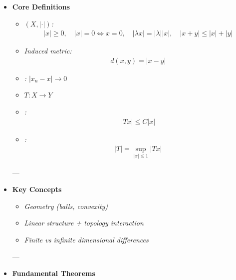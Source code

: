 \documentclass[12pt,a4paper]{report}
\begin{document}
\begin{description}
\begin{itemize}
Add  $\to$ geometry + analysis.

---

    \item \textbf{Core Definitions}

            \begin{itemize}
            \item \textit{ $(X,|\cdot|)$:}
\begin{align*}
  |x|\ge 0,\quad |x|=0 \iff x=0,\quad |\lambda x|=|\lambda||x|,\quad |x+y|\le |x|+|y|
\end{align*}

            \item \textit{Induced metric:}
\begin{align*}
  d(x,y)=|x-y|
\end{align*}

            \item \textit{: $|x_n-x|\to 0$}

            \item \textit{ $T:X\to Y$}

            \item \textit{:}
\begin{align*}
  |Tx|\le C|x|
\end{align*}

            \item \textit{:}
\begin{align*}
  |T|=\sup_{|x|\le 1}|Tx|
\end{align*}

            \end{itemize}
---

    \item \textbf{Key Concepts}

            \begin{itemize}
            \item \textit{Geometry (balls, convexity)}
            \item \textit{Linear structure + topology interaction}
            \item \textit{Finite vs infinite dimensional differences}
            \end{itemize}

---

    \item \textbf{Fundamental Theorems}


\end{itemize}
\end{description}
\end{document}
